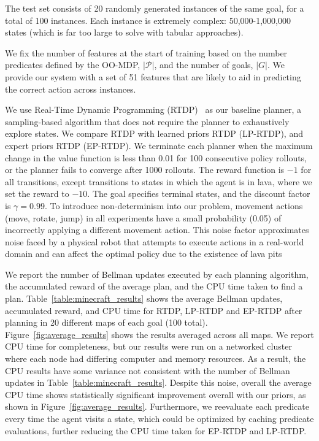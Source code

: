 \documentclass[11pt]{article}
\begin{document}
The test set consists of 20 randomly generated instances of the same goal, for a total of 100 instances. Each instance is extremely complex: 50,000-1,000,000 states (which is far too large to solve with tabular approaches).

We fix the number of features at the start of training based on the number
predicates defined by the OO-MDP, $|\mathcal{P}|$, and the number of goals, $|G|$.
We provide our system with a set of 51 features that are likely to aid in predicting the correct action across instances.

We use Real-Time Dynamic Programming (RTDP)~\cite{barto95} as our
baseline planner, a sampling-based algorithm that does not require the
planner to exhaustively explore states. We compare RTDP with learned
priors RTDP (LP-RTDP), and expert priors RTDP (EP-RTDP).
We terminate each planner when the maximum change in
the value function is less than 0.01 for 100 consecutive policy
rollouts, or the planner fails to converge after 1000 rollouts.  The
reward function is $-1$ for all transitions, except transitions to
states in which the agent is in lava, where we set the reward to
$-10$. The goal specifies terminal states, and the discount factor is
$\gamma = 0.99$.  To introduce non-determinism into our problem,
movement actions (move, rotate, jump) in all experiments have a small
probability (0.05) of incorrectly applying a different movement
action.  This noise factor approximates noise faced by a physical
robot that attempts to execute actions in a real-world domain and
can affect the optimal policy due to the existence of lava pits

We report the number of Bellman updates executed by each planning
algorithm, the accumulated reward of the average plan, and the CPU
time taken to find a plan. Table~\ref{table:minecraft_results} shows
the average Bellman updates, accumulated reward, and CPU time for
RTDP, LP-RTDP and EP-RTDP after planning in 20 different maps of each
goal (100 total). Figure~\ref{fig:average_results} shows the
results averaged across all maps.  We report CPU time for
completeness, but our results were run on a networked cluster where
each node had differing computer and memory resources. As a result,
the CPU results have some variance not consistent with the number of
Bellman updates in Table~\ref{table:minecraft_results}.  Despite this
noise, overall the average CPU time shows statistically significant
improvement overall with our priors, as shown in
Figure~\ref{fig:average_results}. Furthermore, we reevaluate each
predicate every time the agent visits a state, which could be optimized by caching predicate evaluations, further
reducing the CPU time taken for EP-RTDP and LP-RTDP.
\end{document}
